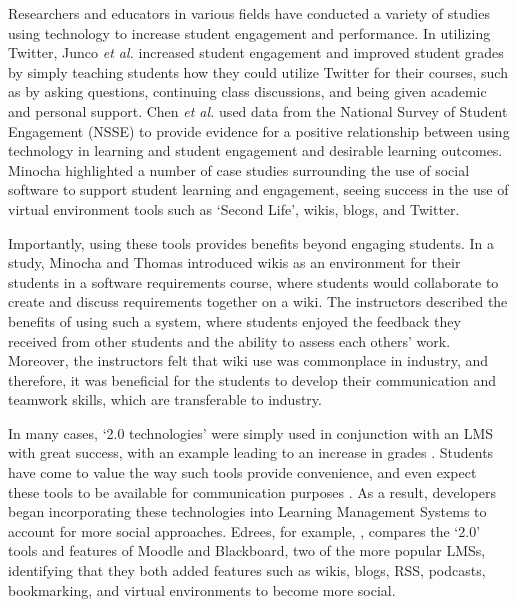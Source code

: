 Researchers and educators in various fields have conducted a variety of studies using technology to increase student engagement and performance. In utilizing Twitter, Junco \textit{et al.} \cite{junco2011effect} increased student engagement and improved student grades by simply teaching students how they could utilize Twitter for their courses, such as by asking questions, continuing class discussions, and being given academic and personal support. Chen \textit{et al.} \cite{chen2010engaging} used data from the National Survey of Student Engagement (NSSE) to provide evidence for a positive relationship between using technology in learning and student engagement and desirable learning outcomes. Minocha \cite{minocha2009study} highlighted a number of case studies surrounding the use of social software to support student learning and engagement, seeing success in the use of virtual environment tools such as `Second Life', wikis, blogs, and Twitter.

Importantly, using these tools provides benefits beyond engaging students. In a study, Minocha and Thomas \cite{minocha2007collaborative} introduced wikis as an environment for their students in a software requirements course, where students would collaborate to create and discuss requirements together on a wiki. The instructors described the benefits of using such a system, where students enjoyed the feedback they received from other students and the ability to assess each others' work. Moreover, the instructors felt that wiki use was commonplace in industry, and therefore, it was beneficial for the students to develop their communication and teamwork skills, which are transferable to industry.

In many cases, `2.0 technologies' were simply used in conjunction with an LMS with great success, with an example leading to an increase in grades \cite{conde2014evolving}. Students have come to value the way such tools provide convenience, and even expect these tools to be available for communication purposes \cite{caruso2007ecar}. As a result, developers began incorporating these technologies into Learning Management Systems to account for more social approaches. Edrees, for example, \cite{edrees2013elearning}, compares the `2.0' tools and features of Moodle and Blackboard, two of the more popular LMSs, identifying that they both added features such as wikis, blogs, RSS, podcasts, bookmarking, and virtual environments to become more social.


